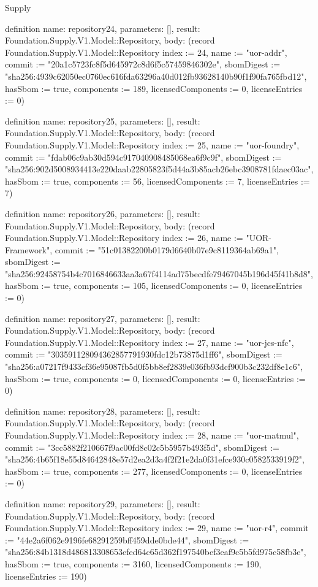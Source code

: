 \begin{lexlean}{Supply}
\begin{semanticmodule}
definition{
  name: repository24,
  parameters: [],
  result: Foundation.Supply.V1.Model::Repository,
  body: (record Foundation.Supply.V1.Model::Repository {index := 24, name := "uor-addr", commit := "20a1c5723fc8f5d645972c8d6f5c57459846302e", sbomDigest := "sha256:4939c62050ec0760ec616fda63296a40d012fb93628140b90f1f90fa765fbd12", hasSbom := true, components := 189, licensedComponents := 0, licenseEntries := 0})
}

definition{
  name: repository25,
  parameters: [],
  result: Foundation.Supply.V1.Model::Repository,
  body: (record Foundation.Supply.V1.Model::Repository {index := 25, name := "uor-foundry", commit := "fdab06c9ab30d594c917040908485068ea6f9c9f", sbomDigest := "sha256:902d5008934413e220daab22805823f5d44a3b85acb26ebc3908781fdaec03ac", hasSbom := true, components := 56, licensedComponents := 7, licenseEntries := 7})
}

definition{
  name: repository26,
  parameters: [],
  result: Foundation.Supply.V1.Model::Repository,
  body: (record Foundation.Supply.V1.Model::Repository {index := 26, name := "UOR-Framework", commit := "51c01382200b0179d6640b07e9c8119364ab69a1", sbomDigest := "sha256:92458754b4c7016846633aa3a67f4114ad75becdfe79467045b196d45f41b8d8", hasSbom := true, components := 105, licensedComponents := 0, licenseEntries := 0})
}

definition{
  name: repository27,
  parameters: [],
  result: Foundation.Supply.V1.Model::Repository,
  body: (record Foundation.Supply.V1.Model::Repository {index := 27, name := "uor-jcs-nfc", commit := "303591128094362857791930fdc12b73875d1ff6", sbomDigest := "sha256:a07217f9433cf36e95087fb5d0f5bb8ef2839e036fb93dcf900b3c232df8e1c6", hasSbom := true, components := 0, licensedComponents := 0, licenseEntries := 0})
}

definition{
  name: repository28,
  parameters: [],
  result: Foundation.Supply.V1.Model::Repository,
  body: (record Foundation.Supply.V1.Model::Repository {index := 28, name := "uor-matmul", commit := "3cc5882f210667f9ac00fd8c02c5b5957b493f5d", sbomDigest := "sha256:4b65f18e55d84642848e57d2ea2d3a4f2f21e2da0f31efce930c0582533919f2", hasSbom := true, components := 277, licensedComponents := 0, licenseEntries := 0})
}

definition{
  name: repository29,
  parameters: [],
  result: Foundation.Supply.V1.Model::Repository,
  body: (record Foundation.Supply.V1.Model::Repository {index := 29, name := "uor-r4", commit := "44e2a6f062e9196fe68291259bff459dde0bde44", sbomDigest := "sha256:84b1318d486813308653efed64c65d362f197540bef3eaf9c5b5fd975c58fb3e", hasSbom := true, components := 3160, licensedComponents := 190, licenseEntries := 190})
}


\end{semanticmodule}
\end{lexlean}
